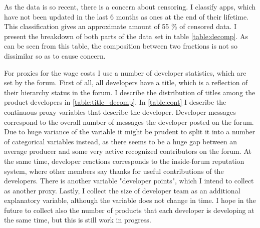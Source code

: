 \documentclass[13pt]{article}
\numberwithin{figure}{section}
\numberwithin{table}{section}
\theoremstyle{indented}
\numberwithin{equation}{section} %
\begin{document}
As the data is so recent, there is a concern about censoring. I classify apps, which have not been updated in the last 6 months as ones at the end of their lifetime. This classification gives an approximate amount of 55 \% of censored data. I present the breakdown of both parts of the data set in table \ref{table:decomp}. As can be seen from this table, the composition between two fractions is not so dissimilar so as to cause concern.

For proxies for the wage costs I use a number of developer statistics, which are set by the forum. First of all, all developers have a title, which is a reflection of their hierarchy status in the forum. I describe the distribution of titles among the product developers in \ref{table:title_decomp}. In \ref{table:cont} I describe the continuous proxy variables that describe the developer. Developer messages correspond to the overall number of messages the developer posted on the forum. Due to huge variance of the variable it might be prudent to split it into a number of categorical variables instead, as there seems to be a huge gap between an average producer and some very active recognized contributors on the forum. At the same time, developer reactions corresponds to the inside-forum reputation system, where other members say thanks for useful contributions of the developers. There is another variable "developer points", which I intend to collect as another proxy. Lastly, I collect the size of developer team as an additional explanatory variable, although the variable does not change in time. I hope in the future to collect also the number of products that each developer is developing at the same time, but this is still work in progress.
\end{document}
